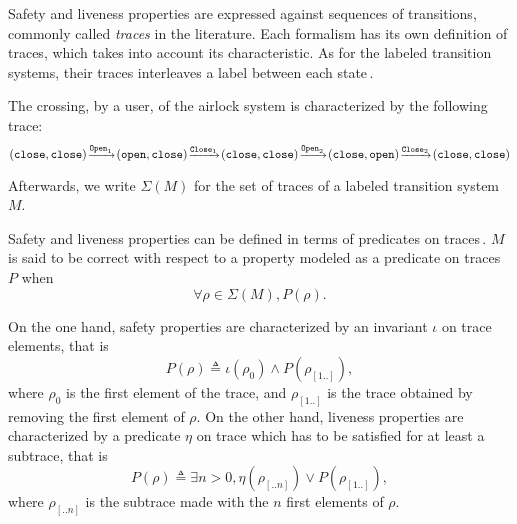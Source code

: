 Safety and liveness properties are expressed against sequences of transitions,
commonly called \emph{traces} in the literature.
%
Each formalism has its own definition of traces, which takes into account its
characteristic.
%
As for the labeled transition systems, their traces interleaves a label between
each state\,\cite{vijayaraghavan2015modular}.

\begin{example}
  The crossing, by a user, of the airlock system is characterized by the
  following trace:
  \[
    \footnotesize (\mathtt{close}, \mathtt{close})%
    \!\xrightarrow{\mathtt{Open}_1}\!(\mathtt{open}, \mathtt{close})%
    \!\xrightarrow{\mathtt{Close}_1}\!(\mathtt{close}, \mathtt{close})%
    \!\xrightarrow{\mathtt{Open}_2}\!(\mathtt{close}, \mathtt{open})%
    \!\xrightarrow{\mathtt{Close}_2}\!(\mathtt{close}, \mathtt{close})
  \]
\end{example}

Afterwards, we write \( \Sigma(M) \) for the set of traces of a labeled
transition system \( M \).

Safety and liveness properties can be defined in terms of predicates on
traces\,\cite{alpern1987recognizing,schneider2000enforceable,basin2013enforceable}.
%
\( M \) is said to be correct with respect to a property modeled as a predicate
on traces \( P \) when
%
\[
  \forall \rho \in \Sigma(M), P(\rho).
\]

On the one hand, safety properties are characterized by an invariant \( \iota \)
on trace elements, that is
%
\[
  P(\rho) \triangleq \iota(\rho_0) \wedge P(\rho_{[1..]}),
\]
%
where \( \rho_0 \) is the first element of the trace, and \( \rho_{[1..]} \) is
the trace obtained by removing the first element of \( \rho \).
%
On the other hand, liveness properties are characterized by a predicate
\( \eta \) on trace which has to be satisfied for at least a subtrace, that is
%
\[
  P(\rho) \triangleq \exists n > 0, \eta(\rho_{[..n]}) \vee P(\rho_{[1..]}),
\]
%
where \( \rho_{[..n]} \) is the subtrace made with the \( n \) first elements of
\( \rho \).

